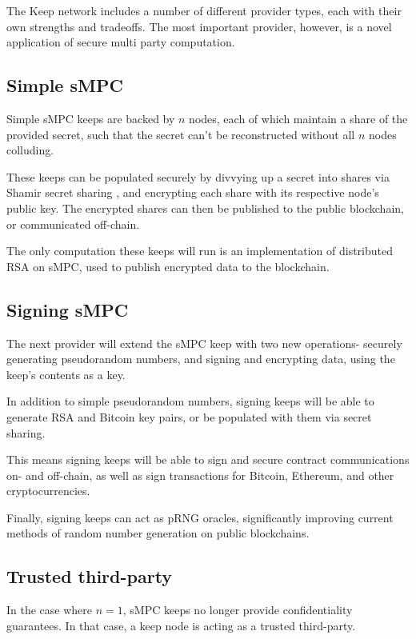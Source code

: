 \documentclass[11pt]{article}
\begin{document}
The Keep network includes a number of different provider types, each
with their own strengths and tradeoffs. The most important provider,
however, is a novel application of secure multi party computation.

\subsection{Simple sMPC}

Simple sMPC keeps are backed by $n$ nodes, each of which maintain a
share of the provided secret, such that the secret can't be
reconstructed without all $n$ nodes colluding.

These keeps can be populated securely by divvying up a secret into
shares via Shamir secret sharing \cite{shamir}, and encrypting each
share with its respective node's public key. The encrypted shares can
then be published to the public blockchain, or communicated off-chain.

The only computation these keeps will run is an implementation of
distributed RSA \cite{mauland2009realizing} on sMPC, used to publish
encrypted data to the blockchain.

\subsection{Signing sMPC}

The next provider will extend the sMPC keep with two new operations-
securely generating pseudorandom numbers, and signing and encrypting
data, using the keep's contents as a key.

In addition to simple pseudorandom numbers, signing keeps will be able
to generate RSA \cite{mauland2009realizing} and Bitcoin
\cite{gennaro2016threshold,coinparty} key pairs, or be populated with
them via secret sharing.

This means signing keeps will be able to sign and secure contract
communications on- and off-chain, as well as sign transactions for
Bitcoin, Ethereum, and other cryptocurrencies.

Finally, signing keeps can act as pRNG oracles, significantly
improving current methods of random number generation on public
blockchains.

\subsection{Trusted third-party}

In the case where $n = 1$, sMPC keeps no longer provide
confidentiality guarantees. In that case, a keep node is acting as a
trusted third-party.
\end{document}
